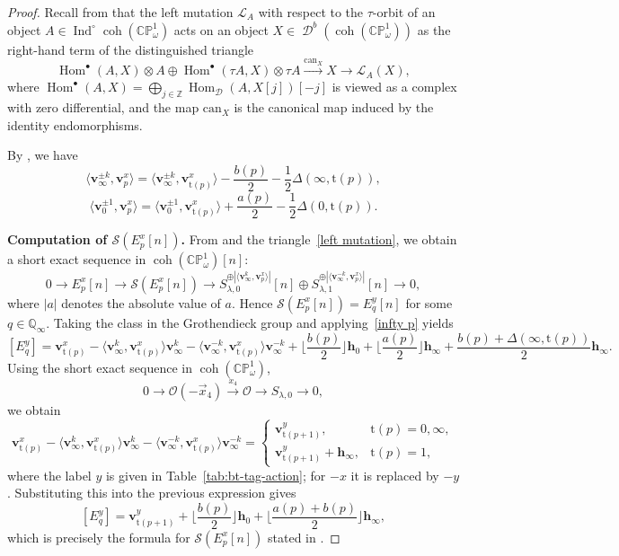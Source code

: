 \documentclass[11pt,a4paper,reqno]{amsart}%
\theoremstyle{plain}
\theoremstyle{definition}
\numberwithin{equation}{section}
\numberwithin{equation}{section}
\newcommand{\Hom}{\operatorname{Hom}\nolimits}
\newcommand{\Ind}{\operatorname{Ind}\nolimits}
\newcommand{\D}{\operatorname{\mathcal{D}}}
\def\wt{\omega}
\newcommand{\bv}{\mathbf{v}}
\def\coh{\operatorname{coh}}
\def\Ind{\operatorname{Ind}}
\def\Hom{\operatorname{Hom}}
\newcommand{\tubR}{\mathcal{S}}
\newcommand{\tubL}{\mathcal{L}}
\newcommand{\typ}[1]{\mathrm{t}(#1)}%
\def\coh{\operatorname{coh}}
\def\CPone{\mathbb{CP}^1_{\wt}}
\newcommand\DC[1]{\D^b(\coh(#1))}
\begin{document}
\begin{proof} 
Recall from \cite{M1997} that the left mutation $\tubL_A$ with respect to the $\tau$-orbit of an object $A\in\Ind^\circ\coh(\CPone)$ acts on an object $X\in\DC{\CPone}$ as the right-hand term of the distinguished triangle
\begin{equation}\label{left mutation}
\Hom^\bullet(A,X)\otimes A\oplus\Hom^\bullet(\tau A,X)\otimes\tau A\xrightarrow{\mathrm{can}_X}X\to \tubL_A(X),
\end{equation}
where $\Hom^\bullet(A,X)=\bigoplus_{j\in\mathbb{Z}}\Hom_{\mathcal{D}}(A,X[j])[-j]$ is viewed as a complex with zero differential, and the map  $\mathrm{can}_X$ is the canonical map induced by the identity endomorphisms.

 


By , we have
\begin{equation}
    \label{infty p}
    \langle \bv_{\infty}^{\pm k}, \bv_{p}^x\rangle
=\langle \bv_{\infty}^{\pm k}, \bv_{\typ{p}}^x\rangle-\frac{b(p)}{2}-\frac{1}{2}\Delta(\infty,\typ{p}),
\end{equation} 
\begin{equation}
    \label{0 p}
    \langle \bv_{0}^{\pm 1}, \bv_{p}^x\rangle
=\langle \bv_{0}^{\pm 1}, \bv_{\typ{p}}^x\rangle+\frac{a(p)}{2}-\frac{1}{2}\Delta(0,\typ{p}).
\end{equation} 
  

\noindent\textbf{Computation of $\tubR(E_p^x[n])$.}
From  and the triangle~\eqref{left mutation}, we obtain a short exact sequence in $\coh(\CPone)[n]$:
\[
0\to E_p^x[n]\to \tubR(E_p^x[n])\to
S_{\lambda,0}^{\oplus|\langle\bv_\infty^k,\bv_p^x\rangle|}[n]
\oplus
S_{\lambda,1}^{\oplus|\langle\bv_\infty^{-k},\bv_p^x\rangle|}[n]\to0,
\]
where $|a|$ denotes the absolute value of $a$.  Hence $\tubR(E_p^x[n])=E_q^y[n]$ for some $q\in\mathbb{Q}_{\infty}$. 
Taking the class in the Grothendieck group and applying~\eqref{infty p} yields
\[
[E_{q}^y]= \bv_{\typ{p}}^x
-\langle\bv_\infty^k,\bv_{\typ{p}}^x\rangle\bv_\infty^k
-\langle\bv_\infty^{-k},\bv_{\typ{p}}^x\rangle\bv_\infty^{-k} +  \lfloor\frac{b(p)}{2} \rfloor\mathbf{h}_0  
+  \lfloor\frac{a(p)}{2} \rfloor\mathbf{h}_{\infty}
+\frac{b(p)+\Delta(\infty,\typ{p})}{2}\mathbf{h}_{\infty}.
\]
Using the short exact sequence  in  $\coh(\CPone)$,
\[
  0\longrightarrow \mathcal{O}( -\vec{x}_4)\stackrel{x_4}{\longrightarrow} \mathcal{O}\longrightarrow  S_{\lambda,0} \longrightarrow 0,
\]
we  obtain
\[
\bv_{\typ{p}}^x
-\langle\bv_\infty^k,\bv_{\typ{p}}^x\rangle\bv_\infty^k
-\langle\bv_\infty^{-k},\bv_{\typ{p}}^x\rangle\bv_\infty^{-k}
=
\begin{cases}
 \bv_{\typ{p+1}}^y , & \typ{p}=0,\infty,\\[4pt]
 \bv_{\typ{p+1}}^y +\mathbf{h}_{\infty}, & \typ{p}=1,
\end{cases}
\] where the label  $y$  is given in Table~\ref{tab:bt-tag-action}; for $-x$ it is  replaced by $-y$.
Substituting this into the previous expression gives  
\[  
[E_{q}^y]= \bv_{\typ{p+1}}^{y} 
          + \lfloor\frac{b(p)}{2} \rfloor\mathbf{h}_0
          + \lfloor\frac{a(p)+b(p)}{2} \rfloor\mathbf{h}_{\infty},
\]
which is precisely the formula for $\tubR(E_p^x[n])$ stated in . 


\end{proof}
\end{document}
